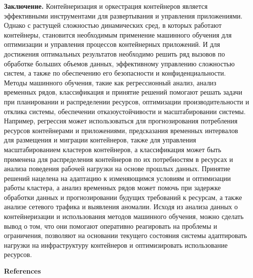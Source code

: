 {\bfseries Заключение.} Контейнеризация и оркестрация контейнеров является
эффективными инструментами для развертывания и управления приложениями.
Однако с растущей сложностью динамических сред, в которых работают
контейнеры, становится необходимым применение машинного обучения для
оптимизации и управления процессов контейнерных приложений. И для
достижения оптимальных результатов необходимо решить ряд вызовов по
обработке больших объемов данных, эффективному управлению сложностью
систем, а также по обеспечению его безопасности и конфиденциальности.
Методы машинного обучения, такие как регрессионный анализ, анализ
временных рядов, классификация и принятие решений помогают решать задачи
при планировании и распределении ресурсов, оптимизации
производительности и отклика системы, обеспечении отказоустойчивости и
масштабировании системы. Например, регрессия может использоваться для
прогнозирования потребления ресурсов контейнерами и приложениями,
предсказания временных интервалов для размещения и миграции контейнеров,
также для управления масштабированием кластеров контейнеров, а
классификация может быть применена для распределения контейнеров по их
потребностям в ресурсах и анализа поведения рабочей нагрузки на основе
прошлых данных. Принятие решений нацелена на адаптацию к изменяющимся
условиям и оптимизации работы кластера, а анализ временных рядов может
помочь при задержке обработки данных и прогнозировании будущих
требований к ресурсам, а также анализе сетевого трафика и выявления
аномалии. Исходя из анализа данных о контейнеризации и использования
методов машинного обучения, можно сделать вывод о том, что они помогают
оперативно реагировать на проблемы и ограничения, позволяют на основании
текущего состояния системы адаптировать нагрузки на инфраструктуру
контейнеров и оптимизировать использование ресурсов.

{\bfseries References}

